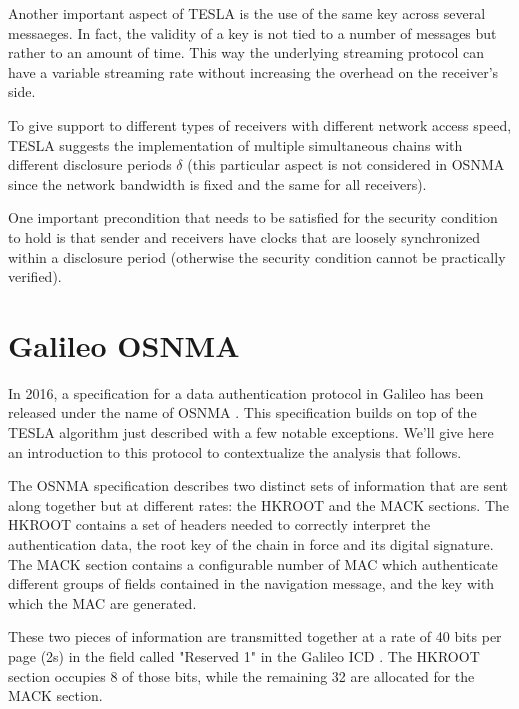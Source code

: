 Another important aspect of TESLA is the use of the same key across several
messaeges. In fact, the validity of a key is not tied to a number of messages
but rather to an amount of time. This way the underlying streaming protocol can
have a variable streaming rate without increasing the overhead on the receiver's
side.

To give support to different types of receivers with different network access
speed, TESLA suggests the implementation of multiple simultaneous chains with
different disclosure periods $\delta$ (this particular aspect is not considered
in OSNMA since the network bandwidth is fixed and the same for all receivers).

One important precondition that needs to be satisfied for the security condition
to hold is that sender and receivers have clocks that are loosely synchronized
within a disclosure period (otherwise the security condition cannot be
practically verified).

\section{Galileo OSNMA}
In 2016, a specification for a data authentication protocol in Galileo has been
released under the name of OSNMA \cite{osnma}. This specification builds on top
of the TESLA algorithm just described with a few notable exceptions. We'll give
here an introduction to this protocol to contextualize the analysis that
follows.

\par

The OSNMA specification describes two distinct sets of information that are sent
along together but at different rates: the HKROOT and the MACK sections. The
HKROOT contains a set of headers needed to correctly interpret the
authentication data, the root key of the chain in force and its digital
signature. The MACK section contains a configurable number of MAC which
authenticate different groups of fields contained in the navigation message, and
the key with which the MAC are generated.

These two pieces of information are transmitted together at a rate of 40 bits
per page (2s) in the field called "Reserved 1" in the Galileo ICD
\cite{galileoicd}. The HKROOT section occupies 8 of those bits, while the
remaining 32 are allocated for the MACK section.

